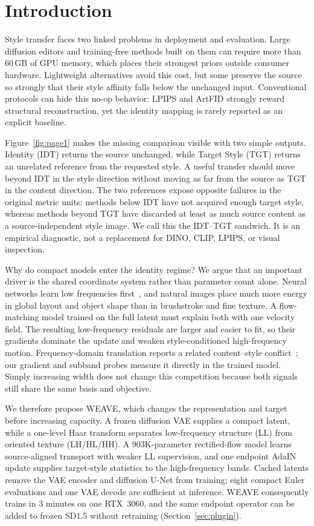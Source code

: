 \documentclass[letterpaper]{article}
\begin{document}
\section{Introduction}

Style transfer faces two linked problems in deployment and evaluation. Large diffusion
editors and training-free methods built on them can require more than 60\,GB of GPU memory,
which places their strongest priors outside consumer hardware. Lightweight alternatives
avoid this cost, but some preserve the source so strongly that their style affinity falls
below the unchanged input. Conventional protocols can hide this no-op behavior: LPIPS and
ArtFID strongly reward structural reconstruction, yet the identity mapping is rarely
reported as an explicit baseline.

Figure~\ref{fig:page1} makes the missing comparison visible with two simple outputs.
Identity (IDT) returns the source unchanged, while Target Style (TGT) returns an unrelated
reference from the requested style. A useful transfer should move beyond IDT in the style
direction without moving as far from the source as TGT in the content direction. The two
references expose opposite failures in the original metric units: methods below IDT have
not acquired enough target style, whereas methods beyond TGT have discarded at least as
much source content as a source-independent style image. We call this the IDT--TGT sandwich.
It is an empirical diagnostic, not a replacement for DINO, CLIP, LPIPS, or visual inspection.

Why do compact models enter the identity regime? We argue that an important driver is the
shared coordinate system rather than parameter count alone. Neural networks learn low
frequencies first~\cite{rahaman2019spectral,xu2022frequency}, and natural images place much
more energy in global layout and object shape than in brushstroke and fine texture. A
flow-matching model trained on the full latent must explain both with one velocity field.
The resulting low-frequency residuals are larger and easier to fit, so their gradients
dominate the update and weaken style-conditioned high-frequency motion. Frequency-domain
translation reports a related content--style conflict~\cite{cai2021fdit}; our gradient and
subband probes measure it directly in the trained model. Simply increasing width does not
change this competition because both signals still share the same basis and objective.

We therefore propose WEAVE, which changes the representation and target before increasing
capacity. A frozen diffusion VAE supplies a compact latent, while a one-level Haar transform
separates low-frequency structure (LL) from oriented texture (LH/HL/HH). A 903K-parameter
rectified-flow model learns source-aligned transport with weaker LL supervision, and one
endpoint AdaIN update supplies target-style statistics to the high-frequency bands. Cached
latents remove the VAE encoder and diffusion U-Net from training; eight compact Euler
evaluations and one VAE decode are sufficient at inference. WEAVE consequently trains in
3 minutes on one RTX~3060, and the same endpoint operator can be added to frozen SD1.5
without retraining (Section~\ref{sec:plugin}).
\end{document}
